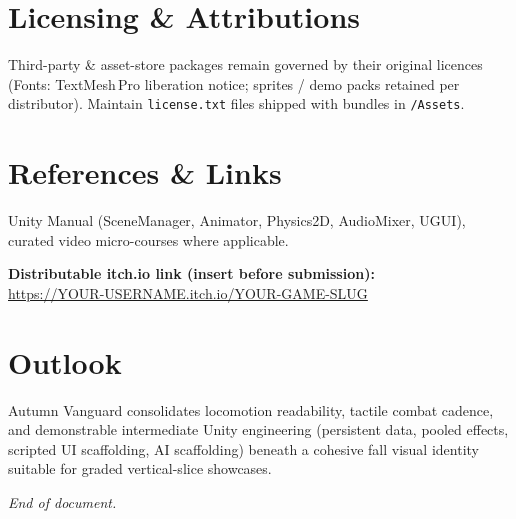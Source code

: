 \documentclass[11pt,a4paper]{article}
\begin{document}
\section{Licensing \& Attributions}
Third-party \& asset-store packages remain governed by their original licences (Fonts: TextMesh\,Pro liberation notice; sprites / demo packs retained per distributor). Maintain \texttt{license.txt} files shipped with bundles in \texttt{/Assets}.

\section{References \& Links}
Unity Manual (SceneManager, Animator, Physics2D, AudioMixer, UGUI), curated video micro-courses where applicable.

\vspace{0.5em}
\noindent
\textbf{Distributable itch.io link (insert before submission):}\\[0.35em]
\url{https://YOUR-USERNAME.itch.io/YOUR-GAME-SLUG}

\section{Outlook}
Autumn Vanguard consolidates locomotion readability, tactile combat cadence, and demonstrable intermediate Unity engineering (persistent data, pooled effects, scripted UI scaffolding, AI scaffolding) beneath a cohesive fall visual identity suitable for graded vertical-slice showcases.

\vfill
\noindent\textit{End of document.}
\end{document}
